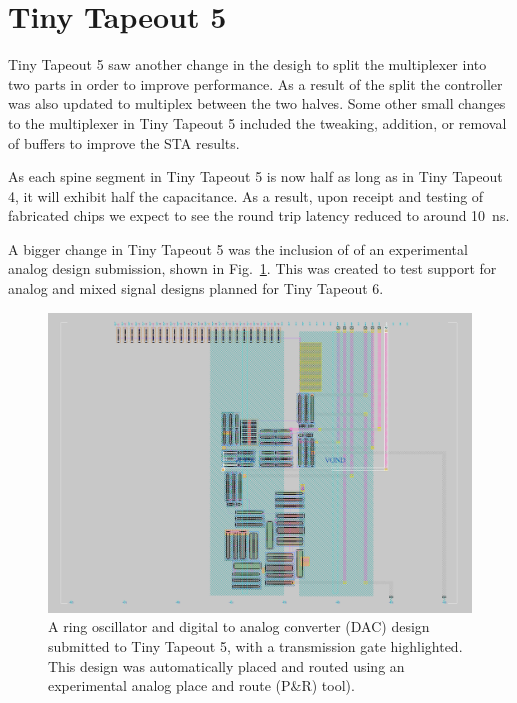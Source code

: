 \section{Tiny Tapeout 5}
\label{sec:tinytapeout5}

Tiny Tapeout 5 saw another change in the desigh to split the multiplexer into two parts in order to improve performance. As a result of the split the controller was also updated to multiplex between the two halves.
Some other small changes to the multiplexer in Tiny Tapeout 5 included the tweaking, addition, or removal of buffers to improve the STA results.

As each spine segment in Tiny Tapeout 5 is now half as long as in Tiny Tapeout 4, it will exhibit half the capacitance. As a result, upon receipt and testing of fabricated chips we expect to see the round trip latency reduced to around \qty{10}{\ns}.

A bigger change in Tiny Tapeout 5 was the inclusion of of an experimental analog design submission, shown in Fig.~\ref{fig:transmission_gate_TT05}.  This was created to test support for analog and mixed signal designs planned for Tiny Tapeout 6.

\begin{figure}[!t]
\centering
\includegraphics[width=\columnwidth]{./Figs/tt05_transmission_gate.png}
\caption{A ring oscillator and digital to analog converter (DAC) design submitted to Tiny Tapeout 5, with a transmission gate highlighted. This design was automatically placed and routed using an experimental analog place and route (P\&R) tool).}
\label{fig:transmission_gate_TT05}
\end{figure}

